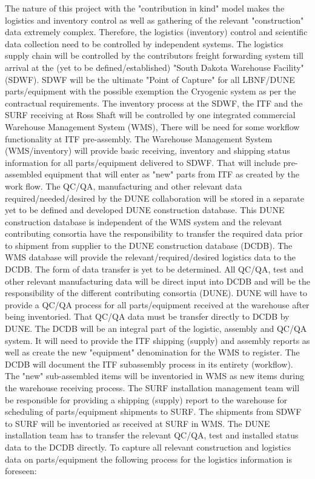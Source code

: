 The nature of this project with the "contribution in kind" model makes the logistics and inventory control as well as gathering of the relevant "construction" data extremely complex. Therefore, the logistics (inventory) control and scientific data collection need to be controlled by independent systems. 
The logistics supply chain will be controlled by the contributors freight forwarding system till arrival at the (yet to be defined/established) "South Dakota Warehouse Facility" (SDWF).  SDWF will be the ultimate "Point of Capture" for all LBNF/DUNE parts/equipment with the possible exemption the Cryogenic system as per the contractual requirements.
The inventory process at the SDWF, the ITF and the SURF receiving at Ross Shaft will be controlled by one integrated commercial Warehouse Management System (WMS), There will be need for some workflow functionality at ITF pre-assembly.
The Warehouse Management System (WMS/inventory) will provide basic receiving, inventory and shipping status information for all parts/equipment delivered to SDWF. That will include pre-assembled equipment that will enter as "new" parts from ITF as created by the work flow.
The QC/QA, manufacturing and other relevant data required/needed/desired by the DUNE collaboration will be stored in a separate yet to be defined and developed DUNE construction database. 
This DUNE construction database is independent of the WMS system and the relevant contributing consortia have the responsibility to transfer the required data prior to shipment from supplier to the DUNE construction database (DCDB).  The WMS database will provide the relevant/required/desired logistics data to the DCDB. The form of data transfer is yet to be determined.
All QC/QA, test and other relevant manufacturing data will be direct input into DCDB and will be the responsibility of the different contributing consortia (DUNE). DUNE will have to provide a QC/QA process for all parts/equipment received at the warehouse after being inventoried. That QC/QA data must be transfer directly to DCDB by DUNE. 
The DCDB will be an integral part of the logistic, assembly and QC/QA system. It will need to provide the ITF shipping (supply) and assembly reports as well as create the new "equipment" denomination for the WMS to register.  The DCDB will document the ITF subassembly process in its entirety (workflow).
The "new" sub-assembled items will be inventoried in WMS as new items during the warehouse receiving process.
The SURF installation management team will be responsible for providing a shipping (supply) report to the warehouse for scheduling of parts/equipment shipments to SURF.
The shipments from SDWF to SURF will be inventoried as received at SURF in WMS.
The DUNE installation team has to transfer the relevant QC/QA, test and installed status data to the DCDB directly.
To capture all relevant construction and logistics data on parts/equipment the following process for the logistics information is foreseen:

